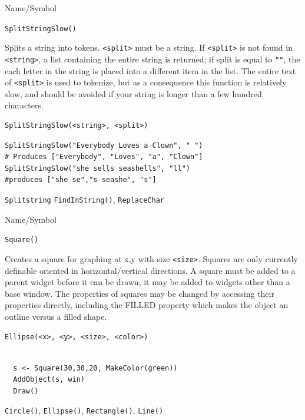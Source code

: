 \begin{desc}{Name/Symbol}
\item[Name/Symbol]  	\verb+SplitStringSlow()+

\item[Description]	Splits a string into tokens. \verb+<split>+ must be a string. If 
		\verb+<split>+ is not found in \verb+<string>+, a list containing the entire 
		string is returned; if split is equal to \verb+""+, the each letter 
		in the string is placed into a different item in the list.  The entire text of \verb+<split>+ is used to tokenize, but as a consequence this function is relatively slow, and should be avoided if your string is longer than a few hundred characters.

\item[Usage]
\begin{verbatim}
SplitStringSlow(<string>, <split>)
\end{verbatim}

\item[Example]      	
\begin{verbatim}
SplitStringSlow("Everybody Loves a Clown", " ") 
# Produces ["Everybody", "Loves", "a", "Clown"]
SplitStringSlow("she sells seashells", "ll")
#produces ["she se","s seashe", "s"] 

\end{verbatim}

\item[See Also] \verb+Splitstring+     	\verb+FindInString()+, \verb+ReplaceChar+
\end{desc}




\begin{desc}{Name/Symbol}
\item[Name/Symbol]	\verb+Square()+
  
\item[Description]	Creates a square for graphing at x,y with size
  \verb+<size>+. Squares are only currently definable oriented in
  horizontal/vertical directions.  A square  must be added
  to a parent widget before it can be drawn; it may be added to
  widgets other than a base window.  The properties of squares may be
  changed by accessing their properties directly, including the FILLED
  property which makes the object an outline versus a filled shape.

\item[Usage]
\begin{verbatim}
Ellipse(<x>, <y>, <size>, <color>)
\end{verbatim}

\item[Example]	
\begin{verbatim}
  
  s <- Square(30,30,20, MakeColor(green))
  AddObject(s, win)
  Draw()

\end{verbatim}
\item[See Also]	 \verb+Circle()+, \verb+Ellipse()+, \verb+Rectangle()+, \verb+Line()+
\end{desc}


